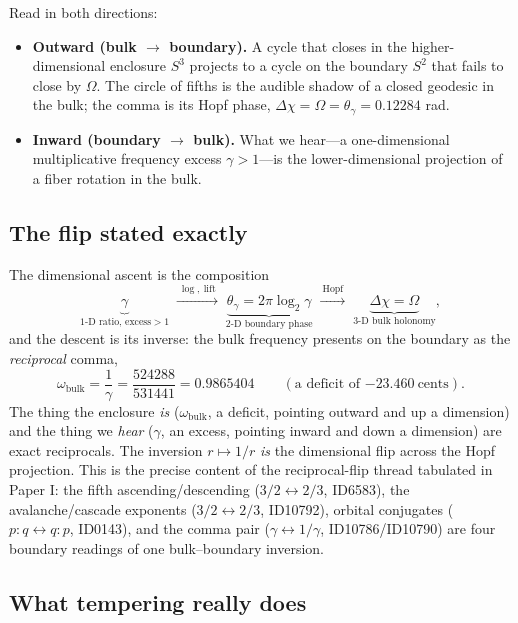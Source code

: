 \documentclass[11pt]{article}
\theoremstyle{remark}
\begin{document}
Read in both directions:
\begin{itemize}
\item \textbf{Outward (bulk $\to$ boundary).} A cycle that closes in the higher-dimensional enclosure $S^3$ projects to a cycle on the boundary $S^2$ that fails to close by $\Omega$. The circle of fifths is the audible shadow of a closed geodesic in the bulk; the comma is its Hopf phase, $\Delta\chi = \Omega = \theta_\gamma = 0.12284$ rad.
\item \textbf{Inward (boundary $\to$ bulk).} What we hear---a one-dimensional multiplicative frequency excess $\gamma > 1$---is the lower-dimensional projection of a fiber rotation in the bulk.
\end{itemize}

\subsection{The flip stated exactly}

The dimensional ascent is the composition
\begin{equation}
\underbrace{\gamma}_{\text{1-D ratio, excess}>1}
\;\xrightarrow{\ \log,\ \text{lift}\ }\;
\underbrace{\theta_\gamma = 2\pi\log_2\gamma}_{\text{2-D boundary phase}}
\;\xrightarrow{\ \text{Hopf}\ }\;
\underbrace{\Delta\chi = \Omega}_{\text{3-D bulk holonomy}},
\end{equation}
and the descent is its inverse: the bulk frequency presents on the boundary as the \emph{reciprocal} comma,
\begin{equation}
\omega_{\mathrm{bulk}} = \frac{1}{\gamma} = \frac{524288}{531441} = 0.9865404 \qquad (\text{a deficit of } {-23.460}\ \text{cents}).
\label{eq:flip}
\end{equation}
The thing the enclosure \emph{is} ($\omega_{\mathrm{bulk}}$, a deficit, pointing outward and up a dimension) and the thing we \emph{hear} ($\gamma$, an excess, pointing inward and down a dimension) are exact reciprocals. The inversion $r \mapsto 1/r$ \emph{is} the dimensional flip across the Hopf projection. This is the precise content of the reciprocal-flip thread tabulated in Paper I: the fifth ascending/descending ($3/2 \leftrightarrow 2/3$, ID6583), the avalanche/cascade exponents ($3/2 \leftrightarrow 2/3$, ID10792), orbital conjugates ($p{:}q \leftrightarrow q{:}p$, ID0143), and the comma pair ($\gamma \leftrightarrow 1/\gamma$, ID10786/ID10790) are four boundary readings of one bulk--boundary inversion.

\subsection{What tempering really does}
\end{document}
